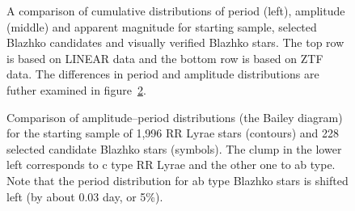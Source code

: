 \begin{figure}[ht]
    \centering
   \caption{A comparison of cumulative distributions of period (left),
   amplitude (middle) and apparent magnitude for starting sample,
   selected Blazhko candidates and visually verified Blazhko
   stars. The top row is based on LINEAR data and the bottom row is
   based on ZTF data. The differences in period and amplitude
   distributions are futher examined in figure~\ref{fig:AmplPeriod2D}.}
      \label{fig:AmplPeriod}
\end{figure}

\begin{figure}[ht]
    \centering
    \caption{Comparison of amplitude--period distributions (the Bailey
      diagram) for the starting sample of 1,996 RR Lyrae stars (contours)
        and 228 selected candidate Blazhko stars (symbols). The clump
        in the lower left corresponds to c type RR Lyrae and the
        other one to ab type. Note that the period distribution for ab
      type Blazhko stars is shifted left (by about 0.03 day, or 5\%).}
      \label{fig:AmplPeriod2D}
\end{figure}


